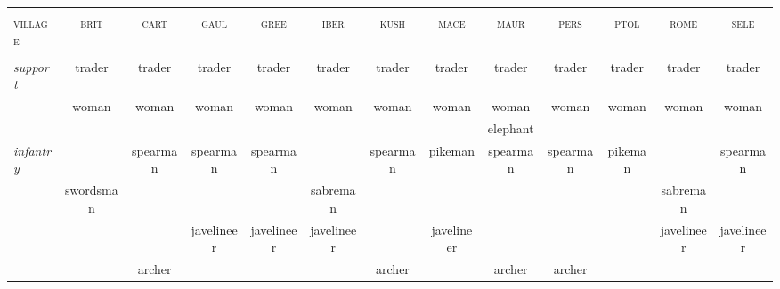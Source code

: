 \documentclass{article}
\newcommand{\brit}{\textsc{\color{blue} brit}}
\newcommand{\cart}{\textsc{\color{blue} cart}}
\newcommand{\gaul}{\textsc{\color{blue} gaul}}
\newcommand{\gree}{\textsc{\color{blue} gree}}
\newcommand{\iber}{\textsc{\color{blue} iber}}
\newcommand{\kush}{\textsc{\color{blue} kush}}
\newcommand{\mace}{\textsc{\color{blue} mace}}
\newcommand{\maur}{\textsc{\color{blue} maur}}
\newcommand{\pers}{\textsc{\color{blue} pers}}
\newcommand{\ptol}{\textsc{\color{blue} ptol}}
\newcommand{\rome}{\textsc{\color{blue} rome}}
\newcommand{\sele}{\textsc{\color{blue} sele}}
\newcommand{\village}{\textsc{\color{blue} village}}
\begin{document}
\begin{landscape}
\footnotesize

\begin{tabular}{l||c|c|c|c||c|c|c|c||c|c|c|c}
\hline
\hline
 &                &                &                &                &                &                &                &                &                &                &                &                \\
\village %
 & \brit          & \cart          & \gaul          & \gree          & \iber          & \kush          & \mace          & \maur          & \pers          & \ptol          & \rome          & \sele          \\
 &                &                &                &                &                &                &                &                &                &                &                &                \\
\hline
\hline\textit{support}
 & trader         & trader         & trader         & trader         & trader         & trader         & trader         & trader         & trader         & trader         & trader         & trader         \\
 & woman          & woman          & woman          & woman          & woman          & woman          & woman          & woman          & woman          & woman          & woman          & woman          \\
 &                &                &                &                &                &                &                & elephant       &                &                &                &                \\
\hline\textit{infantry}
 &                & spearman       & spearman       & spearman       &                & spearman       & pikeman        & spearman       & spearman       & pikeman        &                & spearman       \\
 & swordsman      &                &                &                & sabreman       &                &                &                &                &                & sabreman       &                \\
 &                &                & javelineer     & javelineer     & javelineer     &                & javelineer     &                &                &                & javelineer     & javelineer     \\
 &                & archer         &                &                &                & archer         &                & archer         & archer         &                &                &                \\

\end{tabular}
\end{landscape}
\end{document}
